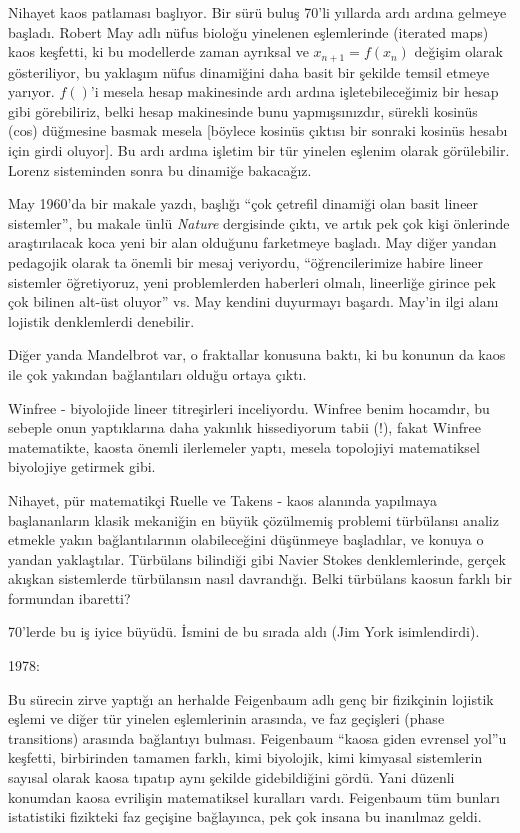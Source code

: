 \documentclass[12pt,fleqn]{article}\usepackage{../../common}
\begin{document}
Nihayet kaos patlaması başlıyor. Bir sürü buluş 70'li yıllarda ardı ardına
gelmeye başladı. Robert May adlı nüfus bioloğu yinelenen eşlemlerinde (iterated
maps) kaos keşfetti, ki bu modellerde zaman ayrıksal ve $x_{n+1}= f(x_n)$
değişim olarak gösteriliyor, bu yaklaşım nüfus dinamiğini daha basit bir şekilde
temsil etmeye yarıyor. $f()$'i mesela hesap makinesinde ardı ardına
işletebileceğimiz bir hesap gibi görebiliriz, belki hesap makinesinde bunu
yapmışsınızdır, sürekli kosinüs (cos) düğmesine basmak mesela [böylece kosinüs
  çıktısı bir sonraki kosinüs hesabı için girdi oluyor]. Bu ardı ardına işletim
bir tür yinelen eşlenim olarak görülebilir. Lorenz sisteminden sonra bu dinamiğe
bakacağız.

May 1960'da bir makale yazdı, başlığı ``çok çetrefil dinamiği olan basit lineer
sistemler'', bu makale ünlü {\em Nature} dergisinde çıktı, ve artık pek çok kişi
önlerinde araştırılacak koca yeni bir alan olduğunu farketmeye başladı. May
diğer yandan pedagojik olarak ta önemli bir mesaj veriyordu, ``öğrencilerimize
habire lineer sistemler öğretiyoruz, yeni problemlerden haberleri olmalı,
lineerliğe girince pek çok bilinen alt-üst oluyor'' vs. May kendini duyurmayı
başardı. May'in ilgi alanı lojistik denklemlerdi denebilir.

Diğer yanda Mandelbrot var, o fraktallar konusuna baktı, ki bu konunun da kaos
ile çok yakından bağlantıları olduğu ortaya çıktı.

Winfree - biyolojide lineer titreşirleri inceliyordu. Winfree benim hocamdır, bu
sebeple onun yaptıklarına daha yakınlık hissediyorum tabii (!), fakat Winfree
matematikte, kaosta önemli ilerlemeler yaptı, mesela topolojiyi matematiksel
biyolojiye getirmek gibi.

Nihayet, pür matematikçi Ruelle ve Takens - kaos alanında yapılmaya
başlananların klasik mekaniğin en büyük çözülmemiş problemi türbülansı analiz
etmekle yakın bağlantılarının olabileceğini düşünmeye başladılar, ve konuya o
yandan yaklaştılar. Türbülans bilindiği gibi Navier Stokes denklemlerinde,
gerçek akışkan sistemlerde türbülansın nasıl davrandığı. Belki türbülans kaosun
farklı bir formundan ibaretti?

70'lerde bu iş iyice büyüdü. İsmini de bu sırada aldı (Jim York
isimlendirdi). 

1978:

Bu sürecin zirve yaptığı an herhalde Feigenbaum adlı genç bir fizikçinin
lojistik eşlemi ve diğer tür yinelen eşlemlerinin arasında, ve faz geçişleri
(phase transitions) arasında bağlantıyı bulması. Feigenbaum ``kaosa giden
evrensel yol''u keşfetti, birbirinden tamamen farklı, kimi biyolojik, kimi
kimyasal sistemlerin sayısal olarak kaosa tıpatıp aynı şekilde gidebildiğini
gördü. Yani düzenli konumdan kaosa evrilişin matematiksel kuralları
vardı. Feigenbaum tüm bunları istatistiki fizikteki faz geçişine bağlayınca, pek
çok insana bu inanılmaz geldi.
\end{document}
